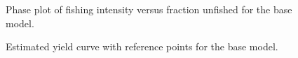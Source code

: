 \documentclass[
]{scrartcl}
\begin{document}
\begin{figure}[H]


\caption{\label{fig-spr-phase}Phase plot of fishing intensity versus
fraction unfished for the base model.}

\end{figure}%

\begin{figure}[H]


\caption{\label{fig-yield}Estimated yield curve with reference points
for the base model.}

\end{figure}%
\end{document}
